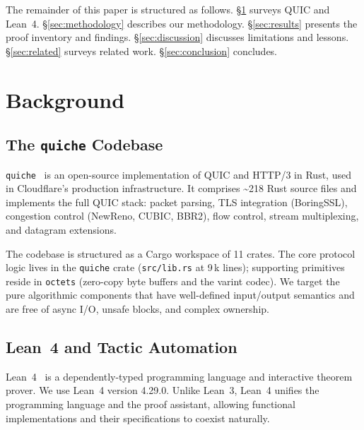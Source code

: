 \documentclass[sigconf,10pt]{acmart}
\begin{document}
The remainder of this paper is structured as follows.
\S\ref{sec:background} surveys QUIC and Lean~4.
\S\ref{sec:methodology} describes our methodology.
\S\ref{sec:results} presents the proof inventory and findings.
\S\ref{sec:discussion} discusses limitations and lessons.
\S\ref{sec:related} surveys related work.
\S\ref{sec:conclusion} concludes.

\section{Background}
\label{sec:background}

\subsection{The \texttt{quiche} Codebase}

\texttt{quiche}~\cite{quiche} is an open-source implementation of QUIC and
HTTP/3 in Rust, used in Cloudflare's production infrastructure.
It comprises \textasciitilde{}218 Rust source files and implements the full
QUIC stack: packet parsing, TLS integration (BoringSSL), congestion
control (NewReno, CUBIC, BBR2), flow control, stream multiplexing, and
datagram extensions.

The codebase is structured as a Cargo workspace of 11 crates.
The core protocol logic lives in the \texttt{quiche} crate
(\texttt{src/lib.rs} at 9\,k lines); supporting primitives reside in
\texttt{octets} (zero-copy byte buffers and the varint codec).
We target the pure algorithmic components that have well-defined
input/output semantics and are free of async I/O, unsafe blocks, and
complex ownership.

\subsection{Lean~4 and Tactic Automation}

Lean~4~\cite{lean4-paper} is a dependently-typed programming language and
interactive theorem prover.
We use Lean~4 version 4.29.0.
Unlike Lean~3, Lean~4 unifies the programming language and the proof
assistant, allowing functional implementations and their specifications to
coexist naturally.
\end{document}
